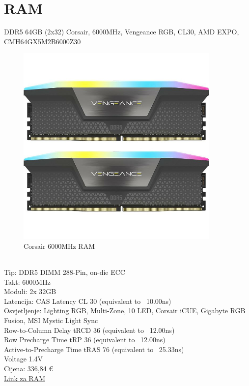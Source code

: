 \documentclass{article}
\begin{document}
\section{RAM}
DDR5 64GB (2x32) Corsair, 6000MHz, Vengeance RGB, CL30, AMD EXPO, CMH64GX5M2B6000Z30
\begin{figure}[h]
    \includegraphics[width=10cm]{ram.jpg}
    \caption{ Corsair 6000MHz RAM}
\end{figure}\\
Tip: DDR5 DIMM 288-Pin, on-die ECC\\
Takt: 6000MHz\\
Moduli: 2x 32GB\\
Latencija: CAS Latency CL 30 (equivalent to ~10.00ns)\\
Osvjetljenje: Lighting RGB, Multi-Zone, 10 LED, Corsair iCUE, Gigabyte RGB Fusion, MSI Mystic Light Sync\\
Row-to-Column Delay tRCD 36 (equivalent to ~12.00ns)\\
Row Precharge Time tRP 36 (equivalent to ~12.00ns)\\
Active-to-Precharge Time tRAS 76 (equivalent to ~25.33ns)\\
Voltage 1.4V \\
Cijena: 336,84 € \\
\href{https://www.adm.hr/ddr5-64gb-2x32-corsair-6000mhz-vengeance-rgb-cl30-amd-expo-cmh6/78840/product/}{Link za RAM}
\newpage
\end{document}
